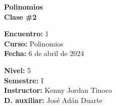 \begin{center} \textbf
{
    \Large Polinomios \\ \vspace{2mm}Clase \#2
}
\end{center}

\begin{multicols}{2}
{
    \textbf{Encuentro:} 1\\
    \textbf{Curso:} Polinomios\\
    \textbf{Fecha:} 6 de abril de 2024\\
    \begin{flushright}
        \textbf{Nivel:} 5\\
        \textbf{Semestre:} I\\
        \textbf{Instructor:} Kenny Jordan Tinoco\\
        \textbf{D. auxiliar: }José Adán Duarte
    \end{flushright}
}
\end{multicols}

\thispagestyle{first-page-style}